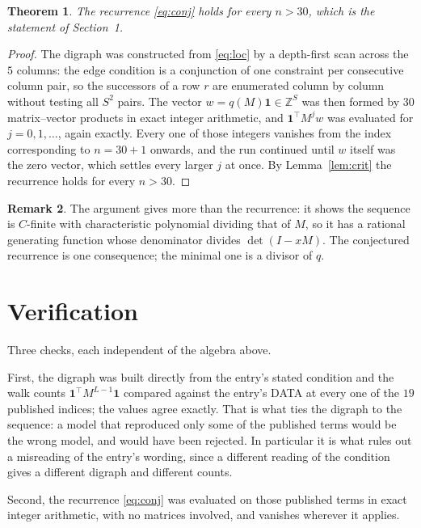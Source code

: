 \documentclass[11pt,a4paper]{article}
\theoremstyle{plain}
\newtheorem{theorem}{Theorem}
\theoremstyle{definition}
\newtheorem{remark}[theorem]{Remark}
\begin{document}
\begin{theorem}
The recurrence \eqref{eq:conj} holds for every $n>30$, which is the statement of
Section~1.
\end{theorem}

\begin{proof}
The digraph was constructed from \eqref{eq:loc} by a depth-first scan across the $5$
columns: the edge condition is a conjunction of one constraint per consecutive column
pair, so the successors of a row $r$ are enumerated column by column without testing all
$S^2$ pairs. The vector $w=q(M)\mathbf{1}\in\mathbb{Z}^{S}$ was then formed by $30$
matrix--vector products in exact integer arithmetic, and $\mathbf{1}^{\!\top}M^{j}w$ was
evaluated for $j=0,1,\dots$, again exactly. Every one of those integers vanishes from the
index corresponding to $n=30+1$ onwards, and the run continued until $w$ itself was the
zero vector, which settles every larger $j$ at once. By Lemma~\ref{lem:crit} the recurrence
holds for every $n>30$.
\end{proof}

\begin{remark}
The argument gives more than the recurrence: it shows the sequence is $C$-finite with
characteristic polynomial dividing that of $M$, so it has a rational generating function
whose denominator divides $\det(I-xM)$. The conjectured recurrence is one consequence; the
minimal one is a divisor of $q$.
\end{remark}

\section{Verification}

Three checks, each independent of the algebra above.

First, the digraph was built directly from the entry's stated condition and the walk counts
$\mathbf{1}^{\!\top}M^{L-1}\mathbf{1}$ compared against the entry's DATA at
every one of the $19$ published indices; the values agree exactly. That is what ties
the digraph to the sequence: a model that reproduced only some of the published terms would
be the wrong model, and would have been rejected. In particular it is what rules out a
misreading of the entry's wording, since a different reading of the condition gives a
different digraph and different counts.

Second, the recurrence \eqref{eq:conj} was evaluated on those published terms in exact
integer arithmetic, with no matrices involved, and vanishes wherever it applies.
\end{document}
